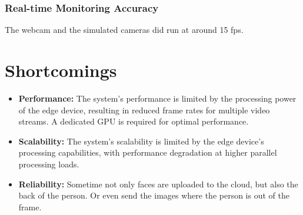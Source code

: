 \documentclass[conference]{IEEEtran}
\begin{document}
\subsubsection{Real-time Monitoring Accuracy}
The webcam and the simulated cameras did run at around 15 fps.

\section{Shortcomings}

\begin{itemize}
      \item \textbf{Performance:} The system's performance is limited by the processing power of the edge device, resulting in reduced frame rates for multiple video streams.
                                    A dedicated GPU is required for optimal performance. 
      \item \textbf{Scalability:} The system's scalability is limited by the edge device's processing capabilities, with performance degradation at higher parallel processing loads.
      \item \textbf{Reliability:} Sometime not only faces are uploaded to the cloud, but also the back of the person. Or even send the images where the person is out of the frame.
\end{itemize}
\end{document}
